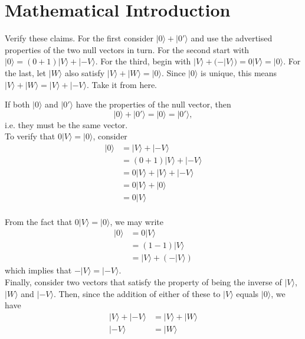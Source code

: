 \documentclass[../principles-of-quantum-mechanics.tex]{subfiles}
\begin{document}
\printanswers

\section{Mathematical Introduction}

\begin{questions}

\question Verify these claims. For the first consider $|0\rangle + |0'\rangle$
and use the advertised properties of the two null vectors in turn. For the
second start with $|0\rangle = (0 + 1)|V\rangle + |{-V}\rangle$. For the third,
begin with $|V\rangle + (-|V\rangle)=0|V\rangle=|0\rangle$. For the last, let
$|W\rangle$ also satisfy $|V\rangle+|W\rangle=|0\rangle$. Since $|0\rangle$ is
unique, this means $|V\rangle+|W\rangle=|V\rangle + |{-V}\rangle$. Take it from
here.

\begin{solution}
	If both $|0\rangle$ and $|0'\rangle$ have the properties of the null vector, then
	\[
		|0\rangle + |0'\rangle = |0\rangle = |0'\rangle,
	\]
	i.e. they must be the same vector. \\
	
	To verify that $0|V\rangle = |0\rangle$, consider
	\begin{align*}
		|0\rangle &= |V\rangle + |{-V}\rangle \\
		&= (0 + 1)|V\rangle + |{-V}\rangle \\
		&= 0|V\rangle + |V\rangle + |{-V}\rangle \\
		&= 0|V\rangle + |0\rangle \\
		&= 0|V\rangle
	\end{align*} \\
	
	From the fact that $0|V\rangle = |0\rangle$, we may write
	\begin{align*}
		|0\rangle &= 0|V\rangle \\
		&= (1 - 1)|V\rangle \\
		&= |V\rangle + (-|V\rangle)
	\end{align*}
	which implies that $-|V\rangle = |{-V}\rangle$. \\
	
	Finally, consider two vectors that satisfy the property of being the inverse of $|V\rangle$, $|W\rangle$ and $|{-V}\rangle$. Then, since the addition of either of these to $|V\rangle$ equals $|0\rangle$, we have
	\begin{align*}
		|V\rangle + |{-V}\rangle &= |V\rangle + |W\rangle \\
		|{-V}\rangle &= |W\rangle
	\end{align*}
\end{solution}


\end{questions}
\end{document}
